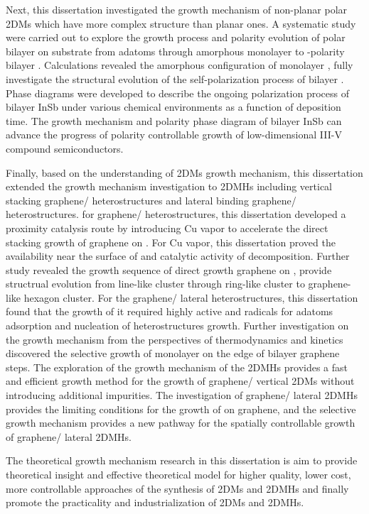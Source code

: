 \begin{englishabstract}
    Next, this dissertation investigated the growth mechanism of non-planar polar 2DMs which have more complex structure than planar ones. A systematic study were carried out to explore the growth process and polarity evolution of polar bilayer  on  substrate from adatoms through amorphous monolayer to -polarity bilayer . Calculations revealed the amorphous configuration of monolayer , fully investigate the structural evolution of the self-polarization process of bilayer . Phase diagrams were developed to describe the ongoing polarization process of bilayer InSb under various chemical environments as a function of deposition time. The growth mechanism and polarity phase diagram of bilayer InSb can advance the progress of polarity controllable growth of low-dimensional III-V compound semiconductors.

    Finally, based on the understanding of 2DMs growth mechanism, this dissertation extended the growth mechanism investigation to 2DMHs including vertical stacking graphene/  heterostructures and lateral binding graphene/ heterostructures. for graphene/  heterostructures, this dissertation developed a proximity catalysis route by introducing Cu vapor to accelerate the direct stacking growth of graphene on . For Cu vapor, this dissertation proved the availability near the surface of  and catalytic activity of  decomposition. Further study revealed the growth sequence of direct growth graphene on , provide structrual evolution from line-like cluster through ring-like cluster to graphene-like hexagon cluster. For the graphene/ lateral heterostructures, this dissertation found that the growth of it required highly active  and  radicals for adatoms adsorption and nucleation of heterostructures growth. Further investigation on the growth mechanism from the perspectives of thermodynamics and kinetics discovered the selective growth of monolayer  on the edge of bilayer graphene steps. The exploration of the growth mechanism of the 2DMHs provides a fast and efficient growth method for the growth of graphene/  vertical 2DMs without introducing additional impurities. The investigation of graphene/ lateral 2DMHs provides the limiting conditions for the growth of  on graphene, and the selective growth mechanism provides a new pathway for the spatially controllable growth of graphene/ lateral 2DMHs. 

    The theoretical growth mechanism research in this dissertation is aim to provide theoretical insight and effective theoretical model for higher quality, lower cost, more controllable approaches of the synthesis of 2DMs and 2DMHs and finally promote the practicality and industrialization of 2DMs and 2DMHs.
    
\end{englishabstract}